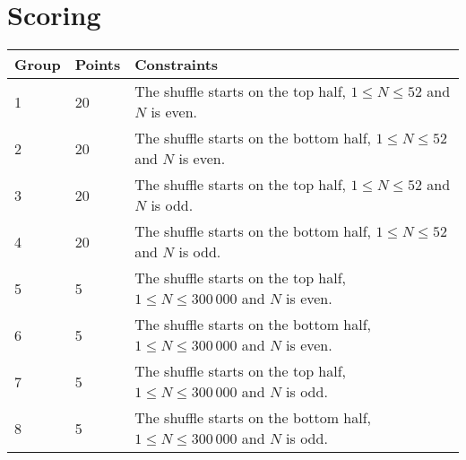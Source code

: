 \section*{Scoring}
\begin{tabular}{|l|l|l|}
\hline
Group & Points & Constraints \\ \hline
1     & 20   & The shuffle starts on the top half, $1 \leq N \leq 52$ and $N$ is even. \\ \hline
2     & 20   & The shuffle starts on the bottom half, $1 \leq N \leq 52$ and $N$ is even. \\ \hline
3     & 20   & The shuffle starts on the top half, $1 \leq N \leq 52$ and $N$ is odd. \\ \hline
4     & 20   & The shuffle starts on the bottom half, $1 \leq N \leq 52$ and $N$ is odd. \\ \hline
5     & 5   & The shuffle starts on the top half, $1 \leq N \leq 300\,000$ and $N$ is even. \\ \hline
6     & 5   & The shuffle starts on the bottom half, $1 \leq N \leq 300\,000$ and $N$ is even. \\ \hline
7     & 5   & The shuffle starts on the top half, $1 \leq N \leq 300\,000$ and $N$ is odd. \\ \hline
8     & 5   & The shuffle starts on the bottom half, $1 \leq N \leq 300\,000$ and $N$ is odd. \\ \hline
\end{tabular}
